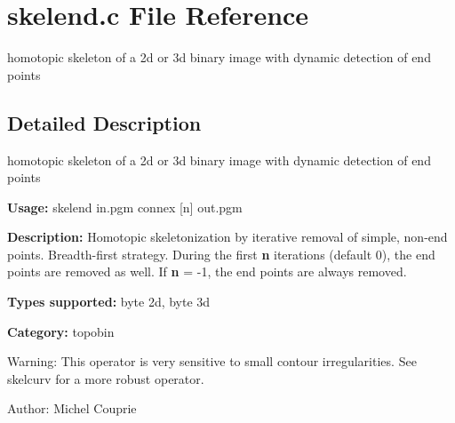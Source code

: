 \section{skelend.c File Reference}
\label{skelend_8c}
homotopic skeleton of a 2d or 3d binary image with dynamic detection of end points 



\subsection{Detailed Description}
homotopic skeleton of a 2d or 3d binary image with dynamic detection of end points 

{\bf Usage:} skelend in.pgm connex [n] out.pgm

{\bf Description:} Homotopic skeletonization by iterative removal of simple, non-end points. Breadth-first strategy. During the first {\bf n} iterations (default 0), the end points are removed as well. If {\bf n} = -1, the end points are always removed.

{\bf Types supported:} byte 2d, byte 3d

{\bf Category:} topobin

\begin{Desc}
\item[Warning:]This operator is very sensitive to small contour irregularities. See skelcurv for a more robust operator.\end{Desc}
\begin{Desc}
\item[Author:]Michel Couprie \end{Desc}
